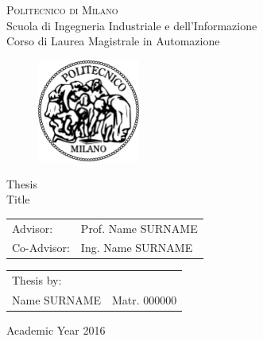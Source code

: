 \begin{titlepage}

\begin{center}
\Large{\textsc{Politecnico di Milano}}\\
\Large{Scuola di Ingegneria Industriale e dell'Informazione}\\
\large{Corso di Laurea Magistrale in Automazione}\\
\par
\par
\end{center}

\vspace{0.5cm}

\begin{center}
\begin{figure}[h]
\centering{}
\includegraphics[width=0.3\textwidth]{title-page/logo-polimi}
\end{figure}
\vspace{1cm}
\par
\end{center}

\begin{center}
\LARGE{Thesis\\
Title}
\vspace{2cm}
\par
\end{center}

\begin{flushleft}
\begin{tabular}{ll}
Advisor:  & Prof. Name SURNAME\tabularnewline
Co-Advisor:  & Ing. Name SURNAME\tabularnewline
\end{tabular}\vspace{1cm}
\par
\end{flushleft}

\begin{flushright}
\begin{tabular}{ll}
Thesis by: & \tabularnewline
Name SURNAME & Matr. 000000\tabularnewline
\end{tabular}\vspace{4cm}
\par
\end{flushright}

\begin{center}
{\large{}Academic Year 2016}
\par
\end{center}{\large \par}

\end{titlepage}